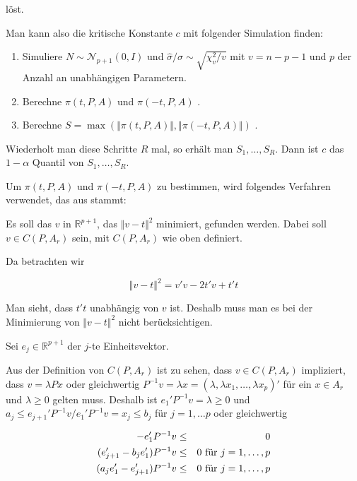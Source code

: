 \documentclass[12pt,a4paper]{article}
\theoremstyle{definition}
\theoremstyle{definition}
\theoremstyle{definition}
\theoremstyle{definition}
\begin{document}
löst. 

Man kann also die kritische Konstante $c$ mit folgender Simulation finden:

\begin{enumerate}
\item Simuliere $N \sim \mathscr{N}_{p+1}(0,I)$ und $\hat{\sigma}/\sigma\sim\sqrt{\chi_v^2/v}$ mit $v=n-p-1$ und $p$ der Anzahl an unabhängigen Parametern.
\item Berechne $\pi(t,P,A)$ und $\pi(-t,P,A)$ .
\item Berechne $S=\max(\Vert \pi(t,P,A) \Vert, \Vert \pi(-t,P,A) \Vert)$ .
\end{enumerate}

Wiederholt man diese Schritte $R$ mal, so erhält man $S_1, \ldots, S_R$. Dann ist $c$ das $1-\alpha$ Quantil von $S_1, \ldots, S_R$.

Um $\pi(t,P,A)$ und $\pi(-t,P,A)$ zu bestimmen, wird folgendes Verfahren verwendet, das aus \cite[Appendix B]{Liu64} stammt:

Es soll das $v$ in $\mathbb{R}^{p+1}$, das $\Vert v-t \Vert^2$ minimiert, gefunden werden. Dabei soll $v \in C(P,A_{r})$ sein, mit $C(P,A_{r})$ wie oben definiert. 

Da betrachten wir

\begin{equation*}
\Vert v-t \Vert^2 = v'v-2t'v+t't 
\end{equation*}

Man sieht, dass $t't$ unabhängig von $v$ ist. Deshalb muss man es bei der Minimierung von $\Vert v-t \Vert^2$ nicht berücksichtigen.
 
Sei $e_j \in \mathbb{R}^{p+1}$ der $j$-te Einheitsvektor. 

Aus der Definition von $C(P,A_{r})$ ist zu sehen, dass $v \in C(P,A_{r})$ impliziert, dass $v=\lambda P x$ oder gleichwertig $P^{-1}v=\lambda x = (\lambda, \lambda x_1, \ldots , \lambda x_p)'$ für ein $x \in A_{r}$ und $\lambda \geq 0$ gelten muss. Deshalb ist $e_1'P^{-1}v = \lambda \geq 0$ und $a_j \leq e_{j+1}'P^{-1}v/e_1'P^{-1}v = x_j \leq b_j$ für $j = 1, \ldots p$ oder gleichwertig

\begin{eqnarray*}
- e_1' P^{-1} v &\leq & 0 \\
(e_{j+1}' - b_j e_1') P^{-1} v &\leq & 0 \textnormal{ für } j = 1, \ldots, p \\
(a_{j} e_1' - e_{j+1}')P^{-1} v &\leq & 0 \textnormal{ für } j = 1, \ldots, p
\end{eqnarray*}
\end{document}
